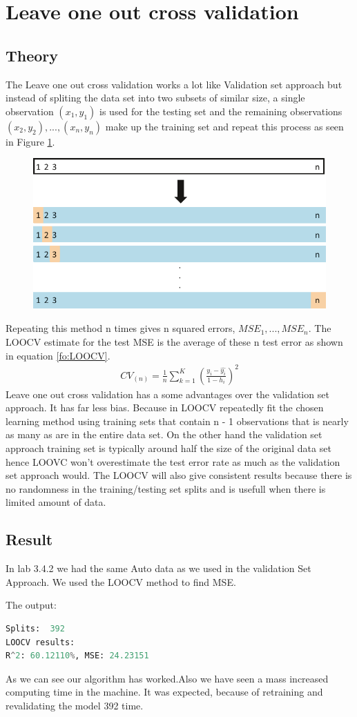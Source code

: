 \section {Leave one out cross validation}
\subsection{Theory}
The Leave one out cross validation works a lot like Validation set approach but instead of spliting the data set into two subsets of
similar size, a single observation $(x_1, y_1)$ is used for the testing set and the remaining observations ${(x_2, y_2), . . . , (x_n, y_n)}$ make up the training set and repeat this process as seen in Figure \ref{fig:loocv}.
\begin{figure}[H]
	\centering
	\includegraphics[width=0.5\linewidth]{crossValidation/LOOCV}
	\caption{}
	\label{fig:loocv}
\end{figure}
Repeating this method n times gives n squared errors, $MSE_1, . . . , MSE_n$. The LOOCV estimate for the test MSE is the average of these n test error as shown in equation \ref{fo:LOOCV}.
\begin{align}\label{fo:LOOCV}
CV_{(n)} = \frac {1}{n} \sum_{k=1}^{K}  (\frac {y_i-\hat{y_i}}{1- h_i})^2
\end{align}
Leave one out cross validation has a some advantages over the validation set approach. It has far less bias. Because in LOOCV repeatedly fit the chosen learning method using training sets that contain n - 1 observations that is nearly as many as are in the entire data set. On the other hand the validation set approach training set is typically around half the size of the original data set hence LOOVC won't overestimate the test error rate as much as the validation set approach would. The LOOCV will also give consistent results because there is no randomness in the training/testing set splits and is usefull when there is limited amount of data.

\subsection{Result}
In lab 3.4.2 we had the same Auto data as we used in the validation Set Approach. We used the LOOCV method to find MSE. 

The output:
\begin{lstlisting}[language=Python]
Splits:  392
LOOCV results:
R^2: 60.12110%, MSE: 24.23151
\end{lstlisting}

As we can see our algorithm has worked.Also we have seen a mass increased computing time in the machine. It was expected, because of retraining and revalidating the model 392 time.